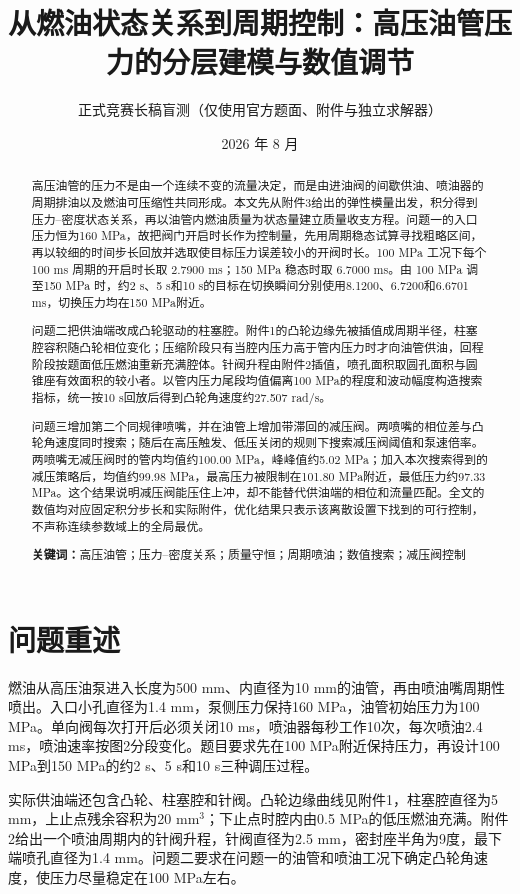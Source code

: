 \documentclass[UTF8,11pt,a4paper]{ctexart}
\title{从燃油状态关系到周期控制：高压油管压力的分层建模与数值调节}
\author{正式竞赛长稿盲测（仅使用官方题面、附件与独立求解器）}
\date{2026 年 8 月}
\newcommand{\keywords}[1]{\par\noindent\textbf{关键词：}#1}
\begin{document}
\maketitle

\begin{abstract}
高压油管的压力不是由一个连续不变的流量决定，而是由进油阀的间歇供油、喷油器的周期排油以及燃油可压缩性共同形成。本文先从附件3给出的弹性模量出发，积分得到压力--密度状态关系，再以油管内燃油质量为状态量建立质量收支方程。问题一的入口压力恒为160 MPa，故把阀门开启时长作为控制量，先用周期稳态试算寻找粗略区间，再以较细的时间步长回放并选取使目标压力误差较小的开阀时长。100 MPa 工况下每个 100 ms 周期的开启时长取 2.7900 ms；150 MPa 稳态时取 6.7000 ms。由 100 MPa 调至150 MPa 时，约2 s、5 s和10 s的目标在切换瞬间分别使用8.1200、6.7200和6.6701 ms，切换压力均在150 MPa附近。

问题二把供油端改成凸轮驱动的柱塞腔。附件1的凸轮边缘先被插值成周期半径，柱塞腔容积随凸轮相位变化；压缩阶段只有当腔内压力高于管内压力时才向油管供油，回程阶段按题面低压燃油重新充满腔体。针阀升程由附件2插值，喷孔面积取圆孔面积与圆锥座有效面积的较小者。以管内压力尾段均值偏离100 MPa的程度和波动幅度构造搜索指标，统一按10 s回放后得到凸轮角速度约27.507 rad/s。

问题三增加第二个同规律喷嘴，并在油管上增加带滞回的减压阀。两喷嘴的相位差与凸轮角速度同时搜索；随后在高压触发、低压关闭的规则下搜索减压阀阈值和泵速倍率。两喷嘴无减压阀时的管内均值约100.00 MPa，峰峰值约5.02 MPa；加入本次搜索得到的减压策略后，均值约99.98 MPa，最高压力被限制在101.80 MPa附近，最低压力约97.33 MPa。这个结果说明减压阀能压住上冲，却不能替代供油端的相位和流量匹配。全文的数值均对应固定积分步长和实际附件，优化结果只表示该离散设置下找到的可行控制，不声称连续参数域上的全局最优。
\keywords{高压油管；压力--密度关系；质量守恒；周期喷油；数值搜索；减压阀控制}
\end{abstract}

\label{mcm-body-start}
\section{问题重述}

燃油从高压油泵进入长度为500 mm、内直径为10 mm的油管，再由喷油嘴周期性喷出。入口小孔直径为1.4 mm，泵侧压力保持160 MPa，油管初始压力为100 MPa。单向阀每次打开后必须关闭10 ms，喷油器每秒工作10次，每次喷油2.4 ms，喷油速率按图2分段变化。题目要求先在100 MPa附近保持压力，再设计100 MPa到150 MPa的约2 s、5 s和10 s三种调压过程。

实际供油端还包含凸轮、柱塞腔和针阀。凸轮边缘曲线见附件1，柱塞腔直径为5 mm，上止点残余容积为20 mm$^3$；下止点时腔内由0.5 MPa的低压燃油充满。附件2给出一个喷油周期内的针阀升程，针阀直径为2.5 mm，密封座半角为9度，最下端喷孔直径为1.4 mm。问题二要求在问题一的油管和喷油工况下确定凸轮角速度，使压力尽量稳定在100 MPa左右。
\end{document}
